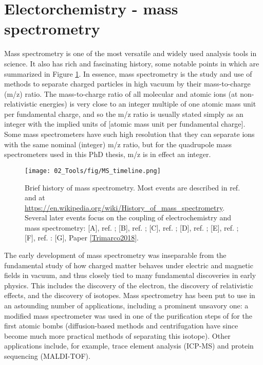 \section{Electorchemistry - mass spectrometry}\label{sec:ECMS}

Mass spectrometry is one of the most versatile and widely used analysis tools in science\cite{Gross2007, Harris2010}. It also has rich and fascinating history\cite{Griffiths2008}, some notable points in which are summarized in Figure \ref{fig:MS_timeline}. In essence, mass spectrometry is the study and use of methods to separate charged particles in high vacuum by their mass-to-charge (m/z) ratio. The mass-to-charge ratio of  all molecular and atomic ions (at non-relativistic energies) is very close to an integer multiple of one atomic mass unit per fundamental charge, and so the m/z ratio is usually stated simply as an integer with the implied units of [atomic mass unit per fundamental charge]. Some mass spectrometers have such high resolution that they can separate ions with the same nominal (integer) m/z ratio\cite{Gross2007}, but for the quadrupole mass spectrometers used in this PhD thesis, m/z is in effect an integer.

\begin{figure}[h!]
	\centering
	\texttt{[image: 02\_Tools/fig/MS\_timeline.png]}
	\caption{Brief history of mass spectrometry. Most events are described in ref.  and at \url{https://en.wikipedia.org/wiki/History_of_mass_spectrometry}. Several later events focus on the coupling of electrochemistry and mass spectrometry: [A], ref. ; [B], ref. ; [C], ref. ; [D], ref. ; [E], ref. ; [F], ref. : [G], Paper \ref{Trimarco2018}.}
	\label{fig:MS_timeline}
\end{figure}

The early development of mass spectrometry was inseparable from the fundamental study of how charged matter behaves under electric and magnetic fields in vacuum, and thus closely tied to many fundamental discoveries in early physics. This includes the discovery of the electron, the discovery of relativistic effects, and the discovery of isotopes. Mass spectrometry has been put to use in an astounding number of applications, including a prominent unsavory one: a modified mass spectrometer was used in one of the purification steps of  for the first atomic bombs (diffusion-based methods and centrifugation have since become much more practical methods of separating this isotope)\cite{Hewlett1962}. Other applications include, for example, trace element analysis (ICP-MS) and protein sequencing (MALDI-TOF).

